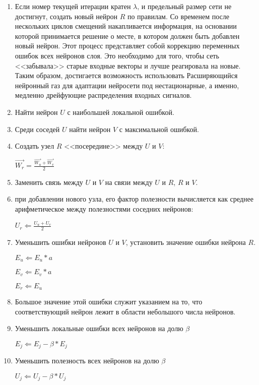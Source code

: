 \documentclass[unicode, 12pt, a4paper,oneside,fleqn]{article}
\begin{document}
\begin{enumerate}
\item \label{gng-u:12} \label{gng:11}
  Если номер текущей итерации кратен $\lambda$, и предельный
  размер сети не достигнут, создать новый нейрон $R$ по правилам. Со
  временем после нескольких циклов смещений накапливается информация,
  на основании которой принимается решение о месте, в котором должен
  быть добавлен новый нейрон. Этот процесс представляет собой
  коррекцию переменных ошибок всех нейронов слоя. Это необходимо для
  того, чтобы сеть <<забывала>> старые входные векторы и лучше
  реагировала на новые. Таким образом, достигается возможность
  использовать Расширяющийся нейронный газ для адаптации нейросети под
  нестационарные, а именно, медленно дрейфующие распределения входных
  сигналов.

\item \label{gng-u:13} \label{gng:12}
  Найти нейрон $U$ с наибольшей локальной ошибкой.

\item \label{gng-u:14} \label{gng:13}
  Среди соседей $U$ найти нейрон $V$ с максимальной ошибкой.

\item \label{gng-u:15} \label{gng:14}
  Создать узел $R$ <<посередине>> между $U$ и $V$:

  $\vec{W_r}=\frac{\vec{W_u} + \vec{W_v}}{2}$

\item \label{gng-u:16} \label{gng:15}
  Заменить связь между $U$ и $V$ на связи между $U$ и $R$, $R$ и
  $V$.

\item \label{gng-u:17} %
  при добавлении нового узла, его фактор полезности вычисляется как
  среднее арифметическое между полезностями соседних нейронов:

  $U_r \Leftarrow \frac{U_u + U_v}{2}$

\item \label{gng-u:18} \label{gng:16}
  Уменьшить ошибки нейронов $U$ и $V$, установить значение ошибки
  нейрона $R$.

  $E_u \Leftarrow E_u*a$
  
  $E_v \Leftarrow E_v*a$
  
  $E_r \Leftarrow E_u$

\item \label{gng-u:19} \label{gng:17}
  Большое значение этой ошибки служит указанием на то, что
  соответствующий нейрон лежит в области небольшого числа нейронов.

\item \label{gng-u:20} \label{gng:18}
  Уменьшить локальные ошибки всех нейронов на долю $\beta$
  
  $E_j \Leftarrow E_j - \beta*E_j$

\item \label{gng-u:21} %
  Уменьшить полезность всех нейронов на долю $\beta$

  $U_j \Leftarrow U_j - \beta*U_j$

\end{enumerate}
\end{document}
